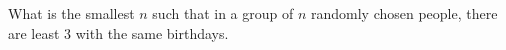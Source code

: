   What is the smallest $n$
  such that in a group of $n$ randomly
  chosen people,
  there are least 3 with the same birthdays.
